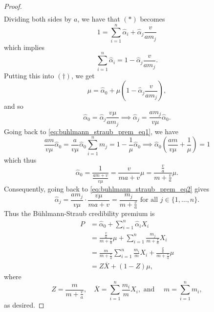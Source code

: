 \documentclass[notoc,notitlepage]{tufte-book}
\begin{document}
\begin{proof}
\begin{gather}
  \end{gather}
  Dividing both sides by $a$, we have that $(*)$ becomes
  \begin{equation*}
    1 = \sum_{i=1}^{n} \hat{\alpha}_i + \hat{\alpha}_j \frac{v}{am_j}
  \end{equation*}
  which implies
  \begin{equation}\label{eq:buhlmann_straub_prem_eq1}
    \sum_{i=1}^{n} \hat{\alpha}_i = 1 - \hat{\alpha}_j \frac{v}{am_j}.
  \end{equation}
  Putting this into $(\dagger)$, we get
  \begin{equation*}
    \mu = \hat{\alpha}_0 + \mu \left( 1 - \hat{\alpha}_j \frac{v}{am_j} \right),
  \end{equation*}
  and so
  \begin{equation}\label{eq:buhlmann_straub_prem_eq2}
    \hat{\alpha}_0 = \hat{\alpha}_j \frac{v\mu}{am_j} \implies
    \hat{\alpha}_j = \frac{am_j}{v\mu} \hat{\alpha}_0.
  \end{equation}
  Going back to \cref{eq:buhlmann_straub_prem_eq1}, we have
  \begin{equation*}
    \frac{am}{v\mu} \hat{\alpha}_0
    = \frac{a}{v\mu} \hat{\alpha}_0 \sum_{i=1}^{n} m_j
    = 1 - \frac{1}{\mu} \hat{\alpha}_0
    \implies \hat{\alpha}_0 \left( \frac{am}{v\mu} + \frac{1}{\mu} \right) = 1
  \end{equation*}
  which thus
  \begin{equation*}
    \hat{\alpha}_0 = \frac{1}{\frac{am + v}{v\mu}}
    = \frac{v}{ma + v} \mu
    = \frac{\frac{v}{a}}{m + \frac{v}{a}} \mu.
  \end{equation*}
  Consequently, going back to \cref{eq:buhlmann_straub_prem_eq2} gives
  \begin{equation*}
    \hat{\alpha}_j = \frac{am_j}{v\mu} \cdot \frac{v\mu}{ma +v}
    = \frac{m_j}{m + \frac{v}{a}} \text{ for all } j \in \{1, \ldots, n\}.
  \end{equation*}
  Thus the B\"{u}hlmann-Straub credibility premium is
  \begin{align*}
    P &= \hat{\alpha}_0 + \sum_{i=1}^{n} \hat{\alpha}_i X_i \\
      &= \frac{\frac{v}{a}}{m + \frac{v}{a}} \mu + \sum_{i=1}^{n}
        \frac{m_j}{m+\frac{v}{a}} X_i \\
      &= \frac{m}{m + \frac{v}{a}} \sum_{i=1}^{n} \frac{m_i}{m} X_i
        + \frac{\frac{v}{a}}{m + \frac{v}{a}} \mu \\
      &= Z \overline{X} + (1 - Z) \mu,
  \end{align*}
  where
  \begin{equation*}
    Z = \frac{m}{m + \frac{v}{a}}, \quad
    \overline{X} = \sum_{i=1}^{n} \frac{m_i}{m} X_i,\text{ and }\quad
    m = \sum_{i=1}^{n} m_i,
  \end{equation*}
  as desired.
\end{proof}
\end{document}
